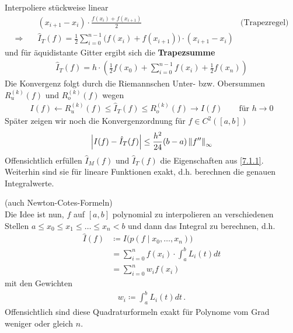 \documentclass[ngerman,fontsize=11pt, paper=a4, parskip=half, titlepage=true, toc=bib]{scrbook}
\begin{document}
Interpoliere stückweise linear
\label{im7.1.3}
\begin{align}\nonumber
  &(x_{i+1}-x_i)\cdot \frac{f(x_i)+f(x_{i+1})}{2} 
  &\text{(Trapezregel)}\\
  \Rightarrow\quad
  & \hat{I}_T(f) = \frac{1}{2}\sum_{i=0}^{n-1}
    \big(
    f(x_i)+f(x_{i+1})
    \big)
    \cdot (x_{i+1}-x_i)
    \label{VII.1.6}
\end{align}
und für äquidistante Gitter ergibt sich die \textbf{Trapezsumme}
\begin{gather}
  \hat{I}_T(f) = h\cdot\left( \frac{1}{2}f(x_0)
    +\sum_{i=0}^{n-1}f(x_i)
    +\frac{1}{2} f(x_n)
  \right)
  \label{VII.1.7}
\end{gather}
Die Konvergenz folgt durch die Riemannschen Unter- bzw. Obersummen
$R_u^{(k)}(f)$ und $R_o^{(k)}(f)$ wegen
\begin{gather*}
  I(f)\longleftarrow R_u^{(k)}(f)
  \leq \hat{I}_T(f)
  \leq R_o^{(k)}(f)\longrightarrow I(f)
  \qquad \text{für } h\longrightarrow 0
\end{gather*}
Später zeigen wir noch die Konvergenzordnung für $f\in C^2([a,b])$
\begin{gather}
  \left| I(f)-\hat{I}_T(f)\right| \leq \frac{h^2}{24}(b-a)\left\| f'' \right\|_\infty
  \label{VII.1.8}
\end{gather}
Offensichtlich erfüllen $\hat{I}_M(f)$ und $\hat{I}_T(f)$
die Eigenschaften aus \ref{7.1.1}.
Weiterhin sind sie für lineare Funktionen exakt,
d.h. berechnen die genauen Integralwerte.


(auch Newton-Cotes-Formeln)\\
Die Idee ist nun, $f$ auf $[a,b]$ polynomial zu interpolieren
an verschiedenen Stellen $a\leq x_0\leq x_1\leq \dots\leq x_n<b$
und dann das Integral zu berechnen, d.h.
\begin{align}\nonumber
  \hat{I}(f) &\coloneqq I\big( p(f\mid x_0,\dots, x_n)\big)\\\nonumber
             &=\sum_{i=0}^{n}f(x_i)
               \cdot \int_a^bL_i(t)dt\\
             &=\sum_{i=0}^{n} w_if(x_i)
               \label{VII.2.1}
\end{align}
mit den Gewichten 
\begin{gather}
  w_i\coloneqq \int_a^bL_i(t)dt\, .
  \label{VII.2.2}
\end{gather}
Offensichtlich sind diese Quadraturformeln exakt
für Polynome vom Grad weniger oder gleich $n$.
\end{document}
